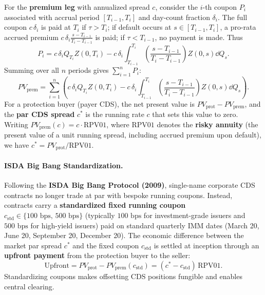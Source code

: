 For the \textbf{premium leg} with annualized spread $c$, consider the $i$-th coupon $P_i$ associated with accrual period $[T_{i-1}, T_i]$ and day-count fraction $\delta_i$. The full coupon $c\,\delta_i$ is paid at $T_i$ if $\tau > T_i$; if default occurs at $s \in [T_{i-1}, T_i]$, a pro-rata accrued premium $c\,\delta_i\frac{s - T_{i-1}}{T_i - T_{i-1}}$ is paid; if $\tau < T_{i-1}$, no payment is made. Thus
\[
P_i = c\,\delta_i Q_{T_i} Z(0, T_i) - c\,\delta_i \int_{T_{i-1}}^{T_i} \left(\frac{s - T_{i-1}}{T_i - T_{i-1}}\right) Z(0, s)\dd Q_s.
\]
Summing over all $n$ periods gives $\sum_{i=1}^n P_i$:
\[
PV_{\text{prem}} = \sum_{i=1}^n \left(c\,\delta_i Q_{T_i} Z(0, T_i) - c\,\delta_i \int_{T_{i-1}}^{T_i} \left(\frac{s - T_{i-1}}{T_i - T_{i-1}}\right) Z(0, s)\dd Q_s\right).
\]
For a protection buyer (payer CDS), the net present value is $PV_{\text{prot}} - PV_{\text{prem}}$, and the \textbf{par CDS spread} $c^*$ is the running rate $c$ that sets this value to zero. Writing $PV_{\text{prem}}(c) = c \cdot \mathrm{RPV01}$, where $\mathrm{RPV01}$ denotes the \textbf{risky annuity} (the present value of a unit running spread, including accrued premium upon default), we have $c^* = PV_{\text{prot}} / \mathrm{RPV01}$.

\paragraph{ISDA Big Bang Standardization.}
Following the \textbf{ISDA Big Bang Protocol (2009)}, single-name corporate CDS contracts no longer trade at par with bespoke running coupons. Instead, contracts carry a \textbf{standardized fixed running coupon} $c_{\mathrm{std}} \in \{100\text{ bps},\, 500\text{ bps}\}$ (typically $100\text{ bps}$ for investment-grade issuers and $500\text{ bps}$ for high-yield issuers) paid on standard quarterly IMM dates (March 20, June 20, September 20, December 20). The economic difference between the market par spread $c^*$ and the fixed coupon $c_{\mathrm{std}}$ is settled at inception through an \textbf{upfront payment} from the protection buyer to the seller:
\[
\mathrm{Upfront} = PV_{\text{prot}} - PV_{\text{prem}}(c_{\mathrm{std}}) = (c^* - c_{\mathrm{std}})\,\mathrm{RPV01}.
\]
Standardizing coupons makes offsetting CDS positions fungible and enables central clearing.


